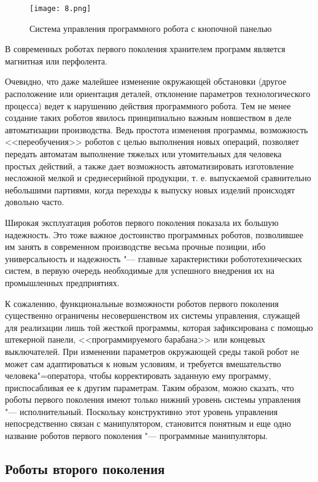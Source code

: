 \documentclass[bachelor, och, referat]{SCWorks}
\begin{document}
\begin{figure}[h!]
    \centering
    \texttt{[image: 8.png]}
    \caption{\label{fig:8}%
    Система управления программного робота с кнопочной панелью}
\end{figure}

В современных роботах первого поколения хранителем программ является магнитная
или перфолента.

Очевидно, что даже малейшее изменение окружающей обстановки (другое расположение
или ориентация деталей, отклонение параметров технологического процесса) ведет к
нарушению действия программного робота. Тем не менее создание таких роботов
явилось принципиально важным новшеством в деле автоматизации производства. Ведь
простота изменения программы, возможность <<переобучения>> роботов с целью
выполнения новых операций, позволяет передать автоматам выполнение тяжелых или
утомительных для человека простых действий, а также дает возможность
автоматизировать изготовление несложной мелкой и среднесерийной продукции, т. е.
выпускаемой сравнительно небольшими партиями, когда переходы к выпуску новых
изделий происходят довольно часто.

Широкая эксплуатация роботов первого поколения показала их большую надежность.
Это тоже важное достоинство программных роботов, позволившее им занять в
современном производстве весьма прочные позиции, ибо универсальность и
надежность "--- главные характеристики робототехнических систем, в первую очередь
необходимые для успешного внедрения их на промышленных предприятиях.

К сожалению, функциональные возможности роботов первого поколения существенно
ограничены несовершенством их системы управления, служащей для реализации лишь
той жесткой программы, которая зафиксирована с помощью штекерной панели,
<<программируемого барабана>> или концевых выключателей. При изменении
параметров окружающей среды такой робот не может сам адаптироваться к новым
условиям, и требуется вмешательство человека"=оператора, чтобы корректировать
заданную ему программу, приспосабливая ее к другим параметрам. Таким образом,
можно сказать, что роботы первого поколения имеют только нижний уровень системы
управления "--- исполнительный. Поскольку конструктивно этот уровень управления
непосредственно связан с манипулятором, становится понятным и еще одно название
роботов первого поколения "--- программные манипуляторы.

\subsection{Роботы второго поколения}
\end{document}
